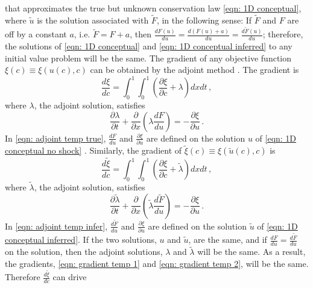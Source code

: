 that approximates the true but unknown conservation law \eqref{eqn: 1D conceptual}, where
$\tilde{u}$ is the solution associated with $\tilde{F}$, in the following sense: If $\tilde{F}$ and $F$ are off by a constant $a$, i.e.
$\tilde{F} = F+a$,
then $\frac{d F(u)}{d u} = \frac{d (F(u)+a)}{d u} = \frac{d \tilde{F}(u)}{d u}$;
therefore, the solutions of \eqref{eqn: 1D conceptual} 
and \eqref{eqn: 1D conceptual inferred}  to any initial value
problem will be the same. 
The gradient of any objective function $\xi(c) \equiv \xi(u(c),c)$ can
be obtained by the adjoint method \cite{adjoint}. The gradient is
\begin{equation}
    \frac{d\xi}{dc} = \int_{0}^1 \int_{0}^1 \left(\frac{\partial \xi}{\partial c} + \lambda\right) dx dt\,,
    \label{eqn: gradient temp 1}
\end{equation}
where $\lambda$, the adjoint solution, satisfies
\begin{equation}
    \frac{\partial \lambda}{\partial t} + \frac{\partial }{\partial x}\left(\lambda \frac{dF}{du}\right)
    = - \frac{\partial \xi}{\partial u} \,.
    \label{eqn: adjoint temp true}
\end{equation}
In \eqref{eqn: adjoint temp true}, $\frac{dF}{du}$ and $\frac{\partial \xi}{\partial u}$
are defined on the solution 
$u$ of \eqref{eqn: 1D conceptual no shock} \cite{adjoint}.
Similarly, the gradient of $\tilde{\xi}(c) \equiv \xi(\tilde{u}(c),c)$ is
\begin{equation}
    \frac{d\tilde{\xi}}{dc} = \int_{0}^1 \int_{0}^1 \left(\frac{\partial \xi}{\partial c} + \tilde{\lambda}\right) dx dt\,,
    \label{eqn: gradient temp 2}
\end{equation}
where $\tilde{\lambda}$, the adjoint solution, satisfies
\begin{equation}
    \frac{\partial \tilde{\lambda}}{\partial t} + \frac{\partial }{\partial x}\left(\tilde{\lambda} \frac{d\tilde{F}}{d{u}}\right)
    = - \frac{\partial \xi}{\partial {u}}\,.
    \label{eqn: adjoint temp infer}
\end{equation}
In \eqref{eqn: adjoint temp infer}, $\frac{d\tilde{F}}{du}$ and $\frac{\partial \xi}{\partial u}$
are defined on the solution
$\tilde{u}$ of \eqref{eqn: 1D conceptual inferred}. 
If the two solutions, $u$ and $\tilde{u}$, are the same, and if 
$\frac{dF}{du} = \frac{d\tilde{F}}{du}$ on the solution, then the adjoint solutions, 
$\lambda$ and $\tilde{\lambda}$ will be the same.
As a result, the gradients, \eqref{eqn: gradient temp 1} and \eqref{eqn: gradient temp 2}, will be 
the same.
Therefore $\frac{d\tilde{\xi}}{dc}$ can drive
